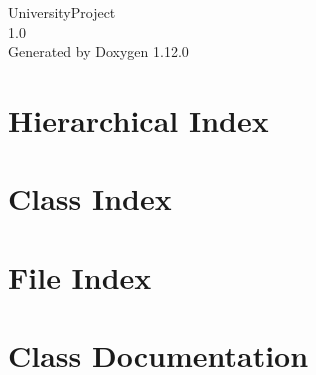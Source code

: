 \documentclass[twoside]{book}
\newcommand{\+}{\discretionary{\mbox{\scriptsize$\hookleftarrow$}}{}{}}
\newcommand{\clearemptydoublepage}{%
    \newpage{\pagestyle{empty}\cleardoublepage}%
  }
\begin{document}
  \raggedbottom
    \hypersetup{pageanchor=false,
                bookmarksnumbered=true,
                pdfencoding=unicode
               }
  \begin{titlepage}
  \vspace*{7cm}
  \begin{center}%
  {\Large University\+Project}\\
  [1ex]\large 1.\+0 \\
  \vspace*{1cm}
  {\large Generated by Doxygen 1.12.0}\\
  \end{center}
  \end{titlepage}
  \clearemptydoublepage
  \tableofcontents
  \clearemptydoublepage
  \hypersetup{pageanchor=true}
\chapter{Hierarchical Index}

\chapter{Class Index}

\chapter{File Index}

\chapter{Class Documentation}



















\end{document}
